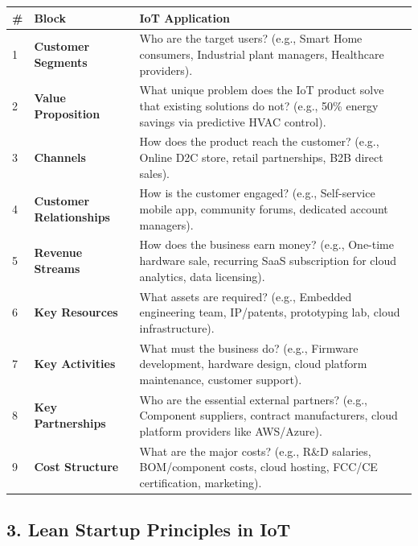 \begin{table}[H]
\centering
\begin{tabular}{|p{}|p{}|p{}|}
\hline
\# & Block & IoT Application \\
\hline
1 & \textbf{Customer Segments} & Who are the target users? (e.g., Smart Home consumers, Industrial plant managers, Healthcare providers). \\
\hline
2 & \textbf{Value Proposition} & What unique problem does the IoT product solve that existing solutions do not? (e.g., 50\% energy savings via predictive HVAC control). \\
\hline
3 & \textbf{Channels} & How does the product reach the customer? (e.g., Online D2C store, retail partnerships, B2B direct sales). \\
\hline
4 & \textbf{Customer Relationships} & How is the customer engaged? (e.g., Self-service mobile app, community forums, dedicated account managers). \\
\hline
5 & \textbf{Revenue Streams} & How does the business earn money? (e.g., One-time hardware sale, recurring SaaS subscription for cloud analytics, data licensing). \\
\hline
6 & \textbf{Key Resources} & What assets are required? (e.g., Embedded engineering team, IP/patents, prototyping lab, cloud infrastructure). \\
\hline
7 & \textbf{Key Activities} & What must the business do? (e.g., Firmware development, hardware design, cloud platform maintenance, customer support). \\
\hline
8 & \textbf{Key Partnerships} & Who are the essential external partners? (e.g., Component suppliers, contract manufacturers, cloud platform providers like AWS/Azure). \\
\hline
9 & \textbf{Cost Structure} & What are the major costs? (e.g., R\&D salaries, BOM/component costs, cloud hosting, FCC/CE certification, marketing). \\
\hline
\end{tabular}
\end{table}


\subsection{3. Lean Startup Principles in IoT}

